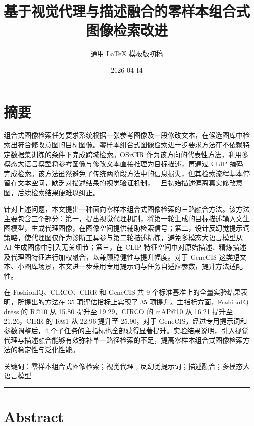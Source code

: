 \documentclass[12pt,a4paper,UTF8,oneside,openany]{ctexrep}
\title{基于视觉代理与描述融合的零样本组合式图像检索改进}
\author{通用 LaTeX 模板版初稿}
\date{2026-04-14}
\begin{document}
\maketitle

{
\setcounter{tocdepth}{2}
\tableofcontents
}
\chapter*{摘\quad 要}

组合式图像检索任务要求系统根据一张参考图像及一段修改文本，在候选图库中检索出符合修改意图的目标图像。零样本组合式图像检索进一步要求方法在不依赖特定数据集训练的条件下完成跨域检索。OSrCIR
作为该方向的代表性方法，利用多模态大语言模型将参考图像与修改文本直接推理为目标描述，再通过
CLIP
编码完成检索。该方法虽然避免了传统两阶段方法中的信息损失，但其检索流程基本停留在文本空间，缺乏对描述结果的视觉验证机制，一旦初始描述偏离真实修改意图，后续检索结果便难以纠正。

针对上述问题，本文提出一种面向零样本组合式图像检索的三路融合方法。该方法主要包含三个部分：第一，提出视觉代理机制，将第一轮生成的目标描述输入文生图模型，生成代理图像，在图像空间提供辅助检索信号；第二，设计反幻觉提示词策略，使代理图仅作为诊断工具参与第二轮描述精炼，避免多模态大语言模型从
AI 生成图像中引入无关细节；第三，在 CLIP
特征空间中对原始描述、精炼描述及代理图特征进行加权融合，以兼顾稳健性与提升幅度。对于
GeneCIS
这类短文本、小图库场景，本文进一步采用专用提示词与任务自适应参数，提升方法适配性。

在 FashionIQ、CIRCO、CIRR 和 GeneCIS 共 9
个标准基准上的全量实验结果表明，所提出的方法在 35 项评估指标上实现了 35
项提升。主指标方面，FashionIQ dress 的 R@10 从 15.80 提升至 19.29，CIRCO
的 mAP@10 从 16.21 提升至 21.26，CIRR 的 R@1 从 22.96 提升至 25.90。对于
GeneCIS，经过专用提示词和参数调整后，4
个子任务的主指标也全部获得显著提升。实验结果说明，引入视觉代理与描述融合能够有效弥补单一路径检索的不足，提高零样本组合式图像检索方法的稳定性与泛化性能。

关键词：零样本组合式图像检索；视觉代理；反幻觉提示词；描述融合；多模态大语言模型

\begin{center}\rule{0.5\linewidth}{0.5pt}\end{center}

\chapter*{Abstract}
\end{document}
